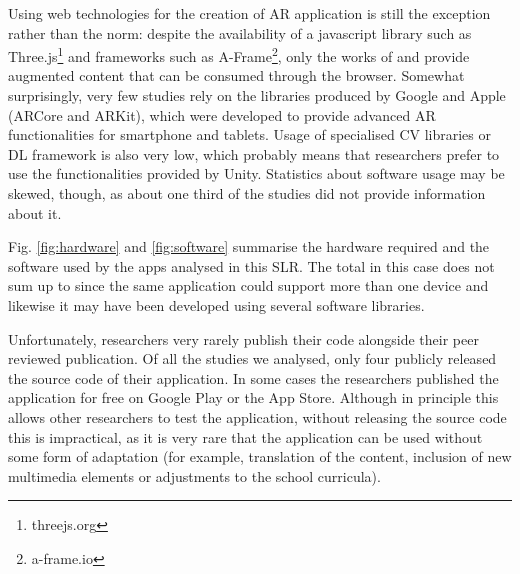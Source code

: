 Using web technologies for the creation of AR application is still the exception rather than the norm: despite the availability of a javascript library such as Three.js\footnote{threejs.org} and frameworks such as A-Frame\footnote{a-frame.io}, only the works of \citet{abriata2020building} and \citet{protopsaltis2016quiz} provide augmented content that can be consumed through the browser.
Somewhat surprisingly, very few studies rely on the libraries produced by Google and Apple (ARCore and ARKit), which were developed to provide advanced \gls{AR} functionalities for smartphone and tablets. Usage of specialised \gls{CV} libraries or \gls{DL} framework is also very low, which probably means that researchers prefer to use the functionalities provided by Unity. Statistics about software usage may be skewed, though, as about one third of the studies did not provide information about it.

Fig. \ref{fig:hardware} and \ref{fig:software} summarise the hardware required and the software used by the apps analysed in this \gls{SLR}. The total in this case does not sum up to \papersSelected since the same application could support more than one device and likewise it may have been developed using several software libraries.

% 	

Unfortunately, researchers very rarely publish their code alongside their peer reviewed publication. Of all the studies we analysed, only four \citep{mylonas2019educational, laviole2018nectar, ManriqueJuan2017APA, abriata2020building} publicly released the source code of their application. In some cases the researchers published the application for free on Google Play or the App Store. Although in principle this allows other researchers to test the application, without releasing the source code this is impractical, as it is very rare that the application can be used without some form of adaptation (for example, translation of the content, inclusion of new multimedia elements or adjustments to the school curricula).

% 	
